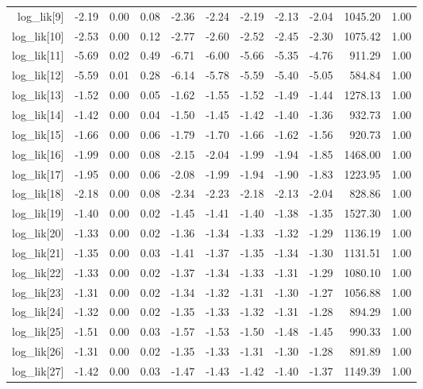 \begin{table}[ht]
\begin{tabular}{rrrrrrrrrrr}
  log\_lik[9] & -2.19 & 0.00 & 0.08 & -2.36 & -2.24 & -2.19 & -2.13 & -2.04 & 1045.20 & 1.00 \\ 
  log\_lik[10] & -2.53 & 0.00 & 0.12 & -2.77 & -2.60 & -2.52 & -2.45 & -2.30 & 1075.42 & 1.00 \\ 
  log\_lik[11] & -5.69 & 0.02 & 0.49 & -6.71 & -6.00 & -5.66 & -5.35 & -4.76 & 911.29 & 1.00 \\ 
  log\_lik[12] & -5.59 & 0.01 & 0.28 & -6.14 & -5.78 & -5.59 & -5.40 & -5.05 & 584.84 & 1.00 \\ 
  log\_lik[13] & -1.52 & 0.00 & 0.05 & -1.62 & -1.55 & -1.52 & -1.49 & -1.44 & 1278.13 & 1.00 \\ 
  log\_lik[14] & -1.42 & 0.00 & 0.04 & -1.50 & -1.45 & -1.42 & -1.40 & -1.36 & 932.73 & 1.00 \\ 
  log\_lik[15] & -1.66 & 0.00 & 0.06 & -1.79 & -1.70 & -1.66 & -1.62 & -1.56 & 920.73 & 1.00 \\ 
  log\_lik[16] & -1.99 & 0.00 & 0.08 & -2.15 & -2.04 & -1.99 & -1.94 & -1.85 & 1468.00 & 1.00 \\ 
  log\_lik[17] & -1.95 & 0.00 & 0.06 & -2.08 & -1.99 & -1.94 & -1.90 & -1.83 & 1223.95 & 1.00 \\ 
  log\_lik[18] & -2.18 & 0.00 & 0.08 & -2.34 & -2.23 & -2.18 & -2.13 & -2.04 & 828.86 & 1.00 \\ 
  log\_lik[19] & -1.40 & 0.00 & 0.02 & -1.45 & -1.41 & -1.40 & -1.38 & -1.35 & 1527.30 & 1.00 \\ 
  log\_lik[20] & -1.33 & 0.00 & 0.02 & -1.36 & -1.34 & -1.33 & -1.32 & -1.29 & 1136.19 & 1.00 \\ 
  log\_lik[21] & -1.35 & 0.00 & 0.03 & -1.41 & -1.37 & -1.35 & -1.34 & -1.30 & 1131.51 & 1.00 \\ 
  log\_lik[22] & -1.33 & 0.00 & 0.02 & -1.37 & -1.34 & -1.33 & -1.31 & -1.29 & 1080.10 & 1.00 \\ 
  log\_lik[23] & -1.31 & 0.00 & 0.02 & -1.34 & -1.32 & -1.31 & -1.30 & -1.27 & 1056.88 & 1.00 \\ 
  log\_lik[24] & -1.32 & 0.00 & 0.02 & -1.35 & -1.33 & -1.32 & -1.31 & -1.28 & 894.29 & 1.00 \\ 
  log\_lik[25] & -1.51 & 0.00 & 0.03 & -1.57 & -1.53 & -1.50 & -1.48 & -1.45 & 990.33 & 1.00 \\ 
  log\_lik[26] & -1.31 & 0.00 & 0.02 & -1.35 & -1.33 & -1.31 & -1.30 & -1.28 & 891.89 & 1.00 \\ 
  log\_lik[27] & -1.42 & 0.00 & 0.03 & -1.47 & -1.43 & -1.42 & -1.40 & -1.37 & 1149.39 & 1.00 \\ 

\end{tabular}
\end{table}
